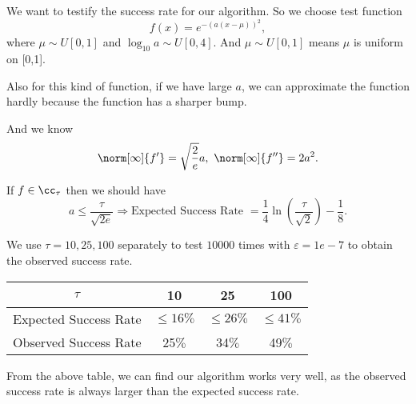 We want to testify the success rate for our algorithm. So we
choose test function $$f(x)=e^{-(a(x-\mu))^2},$$
where $\mu \sim U[0,1]$ and $\log_{10} a \sim U[0,4].$
And $\mu \sim U[0,1]$ means $\mu$ is uniform on [0,1].

Also for this kind of function, if we have large $a$, we can approximate the function hardly
because the function has a sharper bump.

And we know
$$\norm[\infty]{f'}=\sqrt{\frac{2}{e}} a, \ \norm[\infty]{f''}=2a^2.$$

If $f \in \cc_{\tau}$ then we should have
$$a \leq \frac{\tau}{\sqrt{2e}} \Rightarrow \text{Expected Success Rate }= \frac{1}{4}\ln\left(\frac{\tau}{\sqrt{2}}\right) -\frac{1}{8}.$$

We use $\tau = 10, 25 , 100$ separately to test $10000$ times with
$\varepsilon = 1e-7$ to obtain the observed success rate.
\begin{table}[H]
\begin{tabular}{|c |c |c| c |}
\hline
$\tau$ &  10 & 25 & 100\\
\hline
Expected Success Rate &  $\leq 16 \%$ &  $\leq 26 \%$  & $\leq 41 \%$ \\
  \hline
Observed Success Rate & 25$\%$ &  34$\%$  & 49$\%$ \\
\hline
\end{tabular}
\end{table}

From the above table, we can find our algorithm works very well, as the observed
success rate is always larger than the expected success rate.\\





